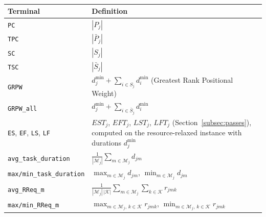\begin{table}[htbp]
  \centering
  \caption[Terminal set of the activity tree]{}
  \label{tab:activity-terminals}
  \small
  \begin{tabularx}{\textwidth}{@{}l X@{}}
    \toprule
    \textbf{Terminal} & \textbf{Definition} \\
    \midrule
    \texttt{PC} & $|P_j|$ \\
    \texttt{TPC} & $|\bar{P}_j|$ \\
    \texttt{SC} & $|S_j|$ \\
    \texttt{TSC} & $|\bar{S}_j|$ \\
    \texttt{GRPW} & $d^{\min}_j + \sum_{i \in S_j} d^{\min}_i$
      (Greatest Rank Positional Weight) \\
    \texttt{GRPW\_all} & $d^{\min}_j + \sum_{i \in \bar{S}_j} d^{\min}_i$ \\
    \texttt{ES}, \texttt{EF}, \texttt{LS}, \texttt{LF} & $EST_j$, $EFT_j$,
      $LST_j$, $LFT_j$ (Section~\ref{subsec:passes}),
      computed on the resource-relaxed instance with durations $d^{\min}_j$ \\
    \texttt{avg\_task\_duration} &
      $\frac{1}{|\mathcal{M}_j|} \sum_{m \in \mathcal{M}_j} d_{jm}$ \\
    \texttt{max/min\_task\_duration} &
      $\max_{m \in \mathcal{M}_j} d_{jm}$,\;
      $\min_{m \in \mathcal{M}_j} d_{jm}$ \\
    \texttt{avg\_RReq\_m} &
      $\frac{1}{|\mathcal{M}_j|\,|\mathcal{K}|}
       \sum_{m \in \mathcal{M}_j} \sum_{k \in \mathcal{K}} r_{jmk}$ \\
    \texttt{max/min\_RReq\_m} &
      $\max_{m \in \mathcal{M}_j,\, k \in \mathcal{K}} r_{jmk}$,\;
      $\min_{m \in \mathcal{M}_j,\, k \in \mathcal{K}} r_{jmk}$ \\
    \bottomrule
  \end{tabularx}
\end{table}

